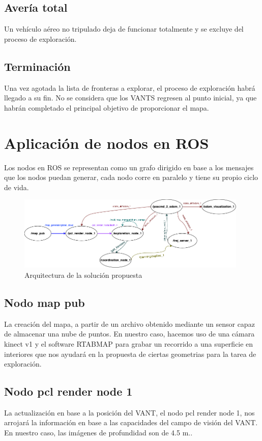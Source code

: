\subsection*{Avería total}

Un vehículo aéreo no tripulado deja de funcionar totalmente y se excluye del proceso de exploración.

\subsection*{Terminación}

Una vez agotada la lista de fronteras a explorar, el proceso de exploración habrá llegado a su fin.
No se considera que los VANTS regresen al punto inicial, ya que habrán completado el principal objetivo de proporcionar el mapa.

\section{Aplicación de nodos en ROS}

Los nodos en ROS se representan como un grafo dirigido en base a los mensajes que los nodos puedan generar, cada nodo corre en paralelo y tiene su propio ciclo de vida.

\begin{figure}[h]
\centering
\includegraphics[width=0.98\textwidth]{images/ros_nodes}
\caption{Arquitectura de la solución propuesta}
\end{figure}

\subsection*{Nodo map pub}
La creación del mapa, a partir de un archivo obtenido mediante un sensor capaz de almacenar una nube de puntos.
En nuestro caso, hacemos uso de una cámara kinect v1 y el software RTABMAP para grabar un recorrido a una superficie en interiores que nos ayudará en la propuesta de ciertas geometrias para la tarea de exploración.

\subsection*{Nodo pcl render node 1}
La actualización en base a la posición del VANT, el nodo pcl render node 1, nos arrojará la información en base a las capacidades del campo de visión del VANT.
En nuestro caso, las imágenes de profundidad son de 4.5 m..

